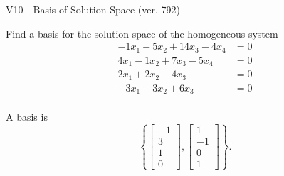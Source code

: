 \begin{exercise}
  \begin{exerciseTitle}V10 - Basis of Solution Space (ver. 792)\end{exerciseTitle}
  \begin{exerciseStatement}
    Find a basis for the solution space of the homogeneous system 
\begin{align*}
 -1 x_ 1 -5 x_ 2 + 14 x_ 3 -4 x_ 4 &= 0  \\ 
  4 x_ 1 -1 x_ 2 + 7 x_ 3 -5 x_ 4 &= 0  \\ 
  2 x_ 1 + 2 x_ 2 -4 x_ 3 &= 0  \\ 
  -3 x_ 1 -3 x_ 2 + 6 x_ 3 &= 0  \\ 
 \end{align*}


 
  \end{exerciseStatement}

  \begin{exerciseAnswer}
   A basis is   
\[\left\{\left[\begin{array}{c}
-1 \\
3 \\
1 \\
0
\end{array}\right] , \left[\begin{array}{c}
1 \\
-1 \\
0 \\
1
\end{array}\right]\right\}.\]

  


  \end{exerciseAnswer}
\end{exercise}
